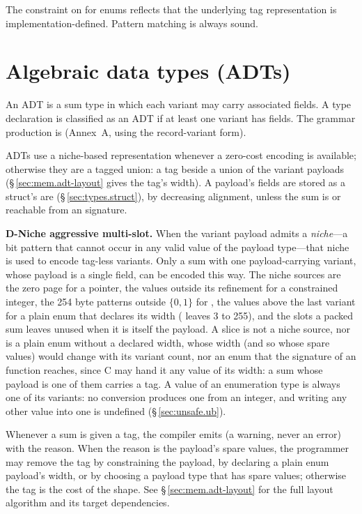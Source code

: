 \begin{note}
  The constraint on \lain{==} for enums reflects that the underlying tag
  representation is implementation-defined.  Pattern matching is always
  sound.
\end{note}

\section{Algebraic data types (ADTs)}
\label{sec:types.adt}

\pnum
An ADT is a sum type in which each variant may carry associated fields.
A type declaration is classified as an ADT if at least one variant has
fields.  The grammar production is  (Annex~A,
using the record-variant form).

\pnum
ADTs use a niche-based representation whenever a zero-cost encoding is
available; otherwise they are a tagged union: a tag beside a union of the variant payloads
(\S\,\ref{sec:mem.adt-layout} gives the tag's width). A payload's fields are stored as a
struct's are (\S\,\ref{sec:types.struct}), by decreasing alignment, unless the sum is
\tok{[ordered]} or reachable from an  signature.

\begin{note}
  \textbf{D-Niche aggressive multi-slot.}
  When the variant payload admits a \textit{niche}---a bit pattern that
  cannot occur in any valid value of the payload type---that niche is
  used to encode tag-less variants.  Only a sum with one
  payload-carrying variant, whose payload is a single field, can be
  encoded this way. The niche sources are the zero page for a pointer,
  the values outside its refinement for a constrained integer, the 254
  byte patterns outside \(\{0, 1\}\) for , the values above
  the last variant for a plain enum that declares its width
  ( leaves 3 to 255), and the slots a
  packed sum leaves unused when it is itself the payload. A slice is not a
  niche source, nor is a plain enum without a declared width, whose width
  (and so whose spare values) would change with its variant count, nor an
  enum that the signature of an  function reaches, since C may
  hand it any value of its width: a sum whose payload is one of them
  carries a tag. A value of an enumeration type is always one of its
  variants: no conversion produces one from an integer, and writing any
  other value into one is undefined (\S\,\ref{sec:unsafe.ub}).

  Whenever a sum is given a tag, the compiler emits  (a
  warning, never an error) with the reason. When the reason is the
  payload's spare values, the programmer may remove the tag by
  constraining the payload, by declaring a plain enum payload's width, or
  by choosing a payload type that has spare values; otherwise the tag is
  the cost of the shape. See
  \S\,\ref{sec:mem.adt-layout} for the full layout algorithm and its
  target dependencies.
\end{note}

